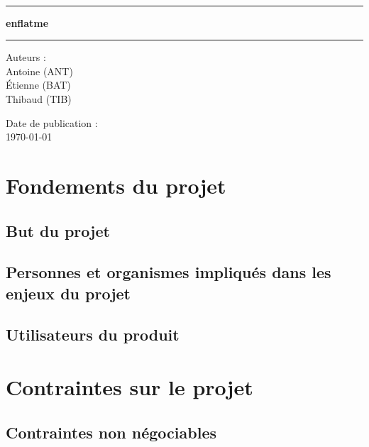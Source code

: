 \documentclass[a4paper, 12pt, french]{report}
\newcommand{\nomProjet}{enflatme\xspace}
\begin{document}
	\begin{titlepage}
		\begin{center}
			\LARGE{} \\
		    \rule{\linewidth}{1.5pt}
		    \huge{\textbf{\nomProjet}}
		    \rule{\linewidth}{1.5pt} \newline{} \newline{}
		\end{center}
		\begin{center}
		    \large{Auteurs :}\\ Antoine  (ANT)\\ Étienne  (BAT) \\ Thibaud  (TIB)
		\end{center}
		\vspace{50px}
		\begin{center}
			\large{Date de publication :}\\ \today
		\end{center}
	\end{titlepage}
	\newpage

	\tableofcontents
	\pagebreak

	\chapter{Fondements du projet}
		\section{But du projet}
			

		\section{Personnes et organismes impliqués dans les enjeux du projet}
			

		\section{Utilisateurs du produit}
			

	\chapter{Contraintes sur le projet}
		\section{Contraintes non négociables}
			
\end{document}
